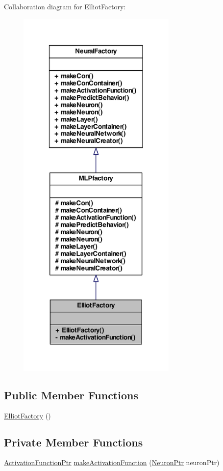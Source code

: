 Collaboration diagram for ElliotFactory:\nopagebreak
\begin{figure}[H]
\begin{center}
\leavevmode
\includegraphics[width=222pt]{class_elliot_factory__coll__graph}
\end{center}
\end{figure}
\subsection*{Public Member Functions}
\begin{DoxyCompactItemize}
\item 
\hyperlink{class_elliot_factory_a4f9af09bc38293cff6b53cef46222db6}{ElliotFactory} ()
\end{DoxyCompactItemize}
\subsection*{Private Member Functions}
\begin{DoxyCompactItemize}
\item 
\hyperlink{_a_m_o_r_e_8h_a77602a0277a02e5769c3df0adc669b17}{ActivationFunctionPtr} \hyperlink{class_elliot_factory_aedc7054f162dea077b2de6beaa7d1577}{makeActivationFunction} (\hyperlink{_a_m_o_r_e_8h_ac1ea936c2c7728eb382278131652fef4}{NeuronPtr} neuronPtr)
\end{DoxyCompactItemize}


